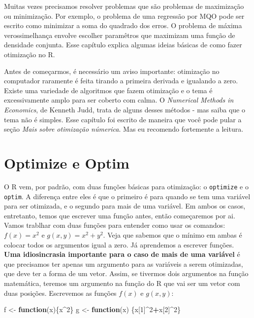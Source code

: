 \documentclass[]{book}
\newenvironment{Shaded}{\begin{snugshade}}{\end{snugshade}}
\newcommand{\DecValTok}[1]{\textcolor[rgb]{0.00,0.00,0.81}{#1}}
\newcommand{\StringTok}[1]{\textcolor[rgb]{0.31,0.60,0.02}{#1}}
\newcommand{\ControlFlowTok}[1]{\textcolor[rgb]{0.13,0.29,0.53}{\textbf{#1}}}
\newcommand{\OperatorTok}[1]{\textcolor[rgb]{0.81,0.36,0.00}{\textbf{#1}}}
\newcommand{\NormalTok}[1]{#1}
\begin{document}
Muitas vezes precisamos resolver problemas que são problemas de
maximização ou minimização. Por exemplo, o problema de uma regressão por
MQO pode ser escrito como minimizar a soma do quadrado dos erros. O
problema de máxima verossimelhança envolve escolher paramêtros que
maximizam uma função de densidade conjunta. Esse capítulo explica
algumas ideias básicas de como fazer otimização no R.

Antes de começarmos, é necessário um aviso importante: otimização no
computador raramente é feita tirando a primeira derivada e igualando a
zero. Existe uma variedade de algoritmos que fazem otimização e o tema é
excessivamente amplo para ser coberto com calma. O \emph{Numerical
Methods in Economics}, de Kenneth Judd, trata de alguns desses métodos -
mas saiba que o tema não é simples. Esse capítulo foi escrito de maneira
que você pode pular a seção \emph{Mais sobre otimização númerica}. Mas
eu recomendo fortemente a leitura.

\section{Optimize e Optim}\label{optimize-e-optim}

O R vem, por padrão, com duas funções básicas para otimização: o
\texttt{optimize} e o \texttt{optim}. A diferença entre eles é que o
primeiro é para quando se tem uma variável para ser otimizada, e o
segundo para mais de uma variável. Em ambos os casos, entretanto, temos
que escrever uma função antes, então começaremos por ai. Vamos trablhar
com duas funções para entender como usar os comandos: \(f(x)=x^2\) e
\(g(x,y)=x^2+y^2\). Veja que sabemos que o mínimo em ambas é colocar
todos os argumentos igual a zero. Já aprendemos a escrever funções.
\textbf{Uma idiosincrasia importante para o caso de mais de uma
variável} é que precisamos ter apenas um argumento para as variáveis a
serem otimizadas, que deve ter a forma de um vetor. Assim, se tivermos
dois argumentos na função matemática, teremos um argumento na função do
R que vai ser um vetor com duas posições. Escrevemos as funções \(f(x)\)
e \(g(x,y)\):

\begin{Shaded}
\begin{Highlighting}[]
\NormalTok{f <-}\StringTok{ }\ControlFlowTok{function}\NormalTok{(x)\{x}\OperatorTok{^}\DecValTok{2}\NormalTok{\}}
\NormalTok{g <-}\StringTok{ }\ControlFlowTok{function}\NormalTok{(x) \{x[}\DecValTok{1}\NormalTok{]}\OperatorTok{^}\DecValTok{2}\OperatorTok{+}\NormalTok{x[}\DecValTok{2}\NormalTok{]}\OperatorTok{^}\DecValTok{2}\NormalTok{\}}
\end{Highlighting}
\end{Shaded}
\end{document}
